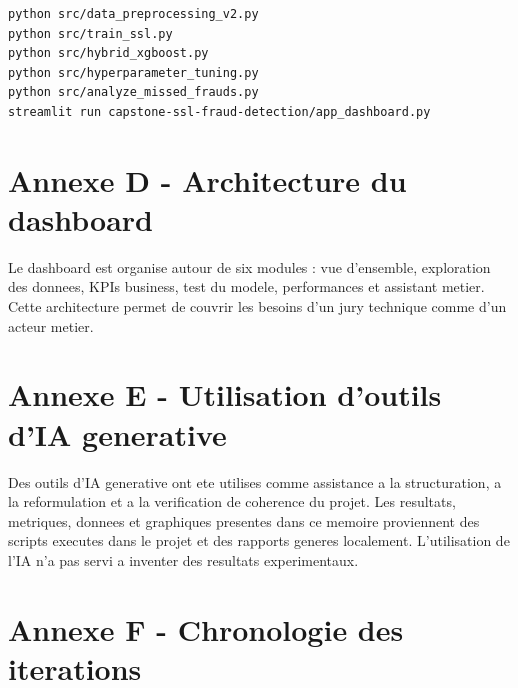 ﻿\documentclass[12pt,a4paper,oneside]{report}
\begin{document}
\begin{verbatim}
python src/data_preprocessing_v2.py
python src/train_ssl.py
python src/hybrid_xgboost.py
python src/hyperparameter_tuning.py
python src/analyze_missed_frauds.py
streamlit run capstone-ssl-fraud-detection/app_dashboard.py
\end{verbatim}

\chapter{Annexe D - Architecture du dashboard}

Le dashboard est organise autour de six modules : vue d'ensemble, exploration des donnees, KPIs business, test du modele, performances et assistant metier. Cette architecture permet de couvrir les besoins d'un jury technique comme d'un acteur metier.

\chapter{Annexe E - Utilisation d'outils d'IA generative}

Des outils d'IA generative ont ete utilises comme assistance a la structuration, a la reformulation et a la verification de coherence du projet. Les resultats, metriques, donnees et graphiques presentes dans ce memoire proviennent des scripts executes dans le projet et des rapports generes localement. L'utilisation de l'IA n'a pas servi a inventer des resultats experimentaux.

\chapter{Annexe F - Chronologie des iterations}
\end{document}
